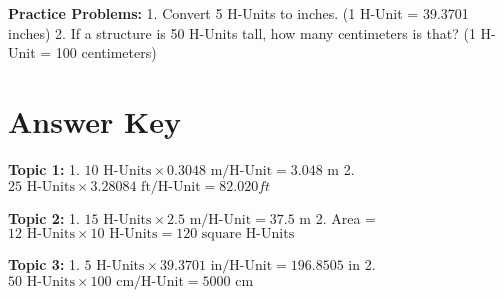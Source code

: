 \documentclass{article}
\begin{document}
\textbf{Practice Problems:}  
1. Convert 5 H-Units to inches. (1 H-Unit = 39.3701 inches)  
2. If a structure is 50 H-Units tall, how many centimeters is that? (1 H-Unit = 100 centimeters)

\section*{Answer Key}
\textbf{Topic 1:}  
1. \(10 \text{ H-Units} \times 0.3048 \text{ m/H-Unit} = 3.048 \text{ m}\)  
2. \(25 \text{ H-Units} \times 3.28084 \text{ ft/H-Unit} = 82.020 ft\)

\textbf{Topic 2:}  
1. \(15 \text{ H-Units} \times 2.5 \text{ m/H-Unit} = 37.5 \text{ m}\)  
2. Area = \(12 \text{ H-Units} \times 10 \text{ H-Units} = 120 \text{ square H-Units}\)

\textbf{Topic 3:}  
1. \(5 \text{ H-Units} \times 39.3701 \text{ in/H-Unit} = 196.8505 \text{ in}\)  
2. \(50 \text{ H-Units} \times 100 \text{ cm/H-Unit} = 5000 \text{ cm}\)
\end{document}
